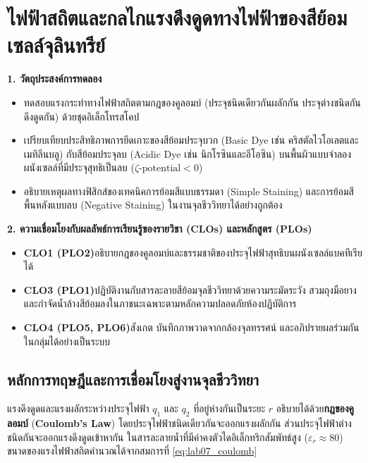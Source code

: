 \chapter{ไฟฟ้าสถิตและกลไกแรงดึงดูดทางไฟฟ้าของสีย้อมเซลล์จุลินทรีย์}

\begin{planbox}
\textbf{1. วัตถุประสงค์การทดลอง}
\begin{itemize}
    \item ทดสอบแรงกระทำทางไฟฟ้าสถิตตามกฎของคูลอมบ์ (ประจุชนิดเดียวกันผลักกัน ประจุต่างชนิดกันดึงดูดกัน) ด้วยชุดอิเล็กโทรสโคป
    \item เปรียบเทียบประสิทธิภาพการยึดเกาะของสีย้อมประจุบวก (Basic Dye เช่น คริสตัลไวโอเลตและเมทิลีนบลู) กับสีย้อมประจุลบ (Acidic Dye เช่น นิกโรซินและอีโอซิน) บนพื้นผิวแบบจำลองผนังเซลล์ที่มีประจุสุทธิเป็นลบ ($\zeta\text{-potential} < 0$)
    \item อธิบายเหตุผลทางฟิสิกส์ของเทคนิคการย้อมสีแบบธรรมดา (Simple Staining) และการย้อมสีพื้นหลังแบบลบ (Negative Staining) ในงานจุลชีววิทยาได้อย่างถูกต้อง
\end{itemize}
\textbf{2. ความเชื่อมโยงกับผลลัพธ์การเรียนรู้ของรายวิชา (CLOs) และหลักสูตร (PLOs)}
\begin{itemize}
    \item \textbf{CLO1 (PLO2)}\quad อธิบายกฎของคูลอมบ์และธรรมชาติของประจุไฟฟ้าสุทธิบนผนังเซลล์แบคทีเรียได้
    \item \textbf{CLO3 (PLO1)}\quad ปฏิบัติงานกับสารละลายสีย้อมจุลชีววิทยาด้วยความระมัดระวัง สวมถุงมือยาง และกำจัดน้ำล้างสีย้อมลงในภาชนะเฉพาะตามหลักความปลอดภัยห้องปฏิบัติการ
    \item \textbf{CLO4 (PLO5, PLO6)}\quad สังเกต บันทึกภาพวาดจากกล้องจุลทรรศน์ และอภิปรายผลร่วมกันในกลุ่มได้อย่างเป็นระบบ
\end{itemize}
\end{planbox}

\section{หลักการทฤษฎีและการเชื่อมโยงสู่งานจุลชีววิทยา}

แรงดึงดูดและแรงผลักระหว่างประจุไฟฟ้า $q_1$ และ $q_2$ ที่อยู่ห่างกันเป็นระยะ $r$ อธิบายได้ด้วย\textbf{กฎของคูลอมบ์} (\textbf{Coulomb's Law}) โดยประจุไฟฟ้าชนิดเดียวกันจะออกแรงผลักกัน ส่วนประจุไฟฟ้าต่างชนิดกันจะออกแรงดึงดูดเข้าหากัน ในสารละลายน้ำที่มีค่าคงตัวไดอิเล็กทริกสัมพัทธ์สูง ($\varepsilon_r \approx 80$) ขนาดของแรงไฟฟ้าสถิตคำนวณได้จากสมการที่ \eqref{eq:lab07_coulomb}

